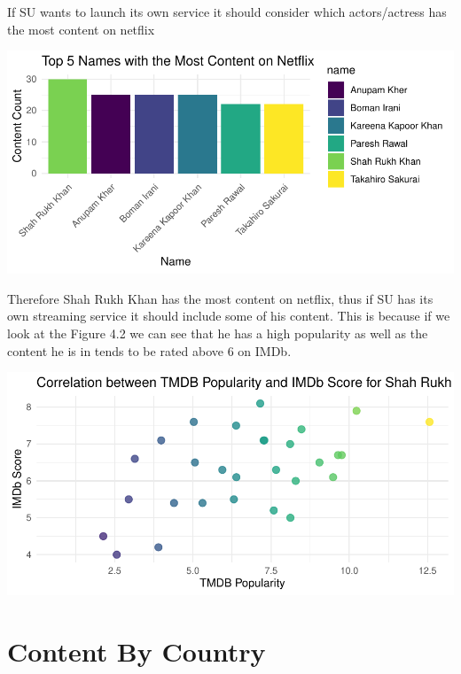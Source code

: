 \documentclass[12pt,preprint, authoryear]{elsarticle}
\let\origfigure\figure
\let\endorigfigure\endfigure
\renewenvironment{figure}[1][2] {
    \expandafter\origfigure\expandafter[H]
} {
    \endorigfigure
}
\numberwithin{equation}{section}
\numberwithin{figure}{section}
\numberwithin{table}{section}
\begin{document}
If SU wants to launch its own service it should consider which
actors/actress has the most content on netflix

\begin{figure}[H]

{\centering \includegraphics{Q4_files/figure-latex/Figure5-1} 

}

\caption{Common Stars on Netflix  \label{Figure1}}\label{fig:Figure5}
\end{figure}

Therefore Shah Rukh Khan has the most content on netflix, thus if SU has
its own streaming service it should include some of his content. This is
because if we look at the Figure 4.2 we can see that he has a high
popularity as well as the content he is in tends to be rated above 6 on
IMDb.

\begin{figure}[H]

{\centering \includegraphics{Q4_files/figure-latex/Figure6-1} 

}

\caption{Correlation \label{Figure3}}\label{fig:Figure6}
\end{figure}

\hypertarget{content-by-country}{%
\section{Content By Country}\label{content-by-country}}
\end{document}
